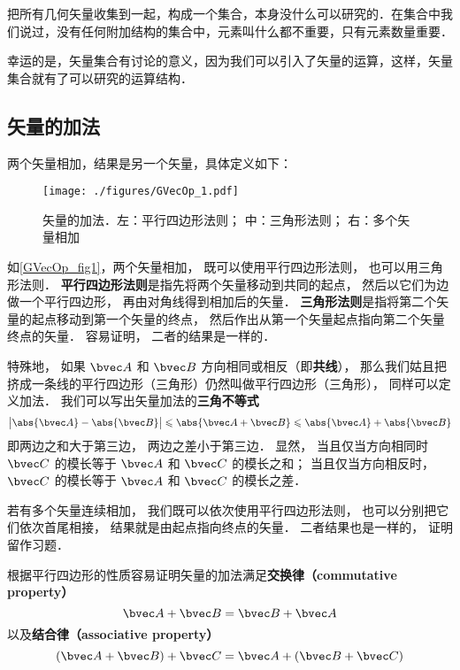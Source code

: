 

把所有几何矢量收集到一起，构成一个集合，本身没什么可以研究的．在集合中我们说过，没有任何附加结构的集合中，元素叫什么都不重要，只有元素数量重要．

幸运的是，矢量集合有讨论的意义，因为我们可以引入了矢量的运算，这样，矢量集合就有了可以研究的运算结构．

\subsection{矢量的加法}
两个矢量相加，结果是另一个矢量，具体定义如下：
\begin{figure}[ht]
\centering
\texttt{[image: ./figures/GVecOp\_1.pdf]}
\caption{矢量的加法．左：平行四边形法则； 中：三角形法则； 右：多个矢量相加} \label{GVecOp_fig1}
\end{figure}
如\autoref{GVecOp_fig1}，两个矢量相加， 既可以使用平行四边形法则， 也可以用三角形法则． \textbf{平行四边形法则}是指先将两个矢量移动到共同的起点， 然后以它们为边做一个平行四边形， 再由对角线得到相加后的矢量． \textbf{三角形法则}是指将第二个矢量的起点移动到第一个矢量的终点， 然后作出从第一个矢量起点指向第二个矢量终点的矢量． 容易证明， 二者的结果是一样的．

特殊地， 如果 $\bvec A$ 和 $\bvec B$ 方向相同或相反（即\textbf{共线}）， 那么我们姑且把挤成一条线的平行四边形（三角形）仍然叫做平行四边形（三角形）， 同样可以定义加法． 我们可以写出矢量加法的\textbf{三角不等式}
\begin{equation}
\big|\abs{\bvec A} - \abs{\bvec B}\big| \leqslant \abs{\bvec A + \bvec B} \leqslant \abs{\bvec A} + \abs{\bvec B}
\end{equation}
即两边之和大于第三边， 两边之差小于第三边． 显然， 当且仅当方向相同时 $\bvec C$ 的模长等于 $\bvec A$ 和 $\bvec C$ 的模长之和； 当且仅当方向相反时， $\bvec C$ 的模长等于 $\bvec A$ 和 $\bvec C$ 的模长之差． 

若有多个矢量连续相加， 我们既可以依次使用平行四边形法则， 也可以分别把它们依次首尾相接， 结果就是由起点指向终点的矢量． 二者结果也是一样的， 证明留作习题．

根据平行四边形的性质容易证明矢量的加法满足\textbf{交换律（commutative property）}
\begin{equation}
\bvec A + \bvec B = \bvec B + \bvec A
\end{equation}
以及\textbf{结合律（associative property）}
\begin{equation}
(\bvec A + \bvec B) + \bvec C = \bvec A + (\bvec B + \bvec C)
\end{equation}


